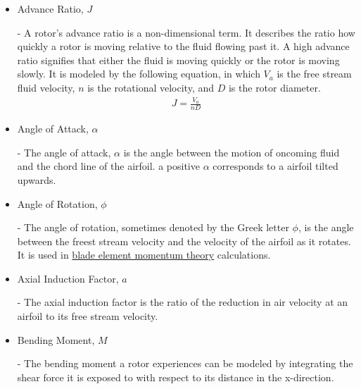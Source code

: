 \documentclass{article}
\begin{document}
\begin{itemize}
	
	\item \hypertarget{J}{Advance Ratio, $J$} - A rotor's advance ratio is a non-dimensional term. It describes the ratio how quickly a rotor is moving relative to the fluid flowing past it. A high advance ratio signifies that either the fluid is moving quickly or the rotor is moving slowly. It is modeled by the following equation, in which $V_{a}$ is the free stream fluid velocity, $n$ is the rotational velocity, and $D$ is the rotor diameter.
	\begin{equation}
	\begin{aligned}
		J = \frac{V_{a}}{n D}
	\end{aligned}
	\end{equation}
		
	\item \hypertarget{alpha}{Angle of Attack, $\alpha$} - The angle of attack, $\alpha$ is the angle between the motion of oncoming fluid and the chord line of the airfoil. a positive $\alpha$ corresponds to a airfoil tilted upwards.
	
	\item \hypertarget{phi}{Angle of Rotation, $\phi$} - The angle of rotation, sometimes denoted by the Greek letter $\phi$, is the angle between the freest stream velocity and the velocity of the airfoil as it rotates. It is used in \hyperlink{BEM}{blade element momentum theory} calculations.

	\item \hypertarget{a}{Axial Induction Factor, $a$} - The axial induction factor is the ratio of the reduction in air velocity at an airfoil to its free stream velocity.
	
	\item \hypertarget{M}{Bending Moment, $M$} - The bending moment a rotor experiences can be modeled by integrating the shear force it is exposed to with respect to its distance in the x-direction. 
	

\end{itemize}
\end{document}
